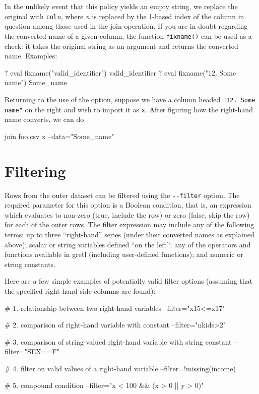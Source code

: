 In the unlikely event that this policy yields an empty string, we
replace the original with \texttt{col}\textsl{n}, where \textsl{n} is
replaced by the 1-based index of the column in question among those
used in the join operation. If you are in doubt regarding the
converted name of a given column, the function \texttt{fixname()} can
be used as a check: it takes the original string as an argument and
returns the converted name. Examples:

\begin{code}
? eval fixname("valid_identifier")
valid_identifier
? eval fixname("12. Some name")
Some_name
\end{code}

Returning to the use of the  option, suppose we have a
column headed \verb|"12. Some name"| on the right and wish to import
it as \texttt{x}. After figuring how the right-hand name converts, we
can do
%
\begin{code}
join foo.csv x --data="Some_name"
\end{code}

\section{Filtering}

Rows from the outer dataset can be filtered using the \verb|--filter|
option. The required parameter for this option is a Boolean condition,
that is, an expression which evaluates to non-zero (true, include the
row) or zero (false, skip the row) for each of the outer rows. The
filter expression may include any of the following terms: up to three
``right-hand'' series (under their converted names as explained
above); scalar or string variables defined ``on the left''; any of the
operators and functions available in gretl (including user-defined
functions); and numeric or string constants.

Here are a few simple examples of potentially valid filter options
(assuming that the specified right-hand side columns are found):

\begin{code}
# 1. relationship between two right-hand variables
--filter="x15<=x17"

# 2. comparison of right-hand variable with constant
--filter="nkids>2"

# 3. comparison of string-valued right-hand variable with string constant
--filter="SEX==\"F\""

# 4. filter on valid values of a right-hand variable
--filter=!missing(income)

# 5. compound condition
--filter="x < 100 && (x > 0 || y > 0)"
\end{code}

